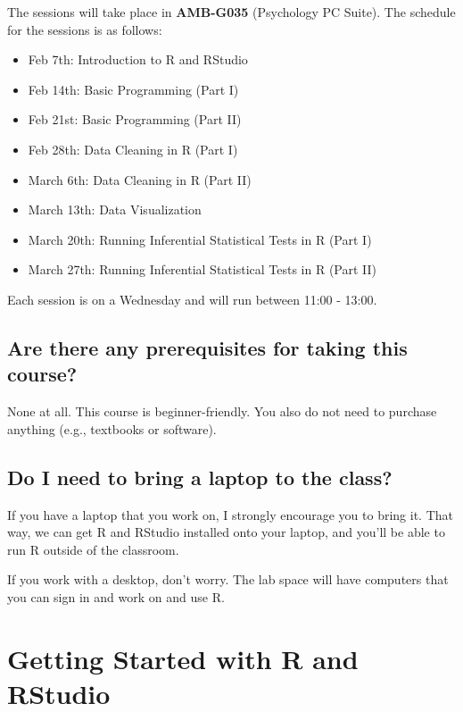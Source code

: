 \documentclass[
]{book}
\providecommand{\tightlist}{%
  \setlength{\itemsep}{0pt}\setlength{\parskip}{0pt}}
\begin{document}
The sessions will take place in \textbf{AMB-G035} (Psychology PC Suite). The schedule for the sessions is as follows:

\begin{itemize}
\tightlist
\item
  Feb 7th: Introduction to R and RStudio
\item
  Feb 14th: Basic Programming (Part I)
\item
  Feb 21st: Basic Programming (Part II)
\item
  Feb 28th: Data Cleaning in R (Part I)
\item
  March 6th: Data Cleaning in R (Part II)
\item
  March 13th: Data Visualization
\item
  March 20th: Running Inferential Statistical Tests in R (Part I)
\item
  March 27th: Running Inferential Statistical Tests in R (Part II)
\end{itemize}

Each session is on a Wednesday and will run between 11:00 - 13:00.

\hypertarget{are-there-any-prerequisites-for-taking-this-course}{%
\section{Are there any prerequisites for taking this course?}\label{are-there-any-prerequisites-for-taking-this-course}}

None at all. This course is beginner-friendly. You also do not need to purchase anything (e.g., textbooks or software).

\hypertarget{do-i-need-to-bring-a-laptop-to-the-class}{%
\section{Do I need to bring a laptop to the class?}\label{do-i-need-to-bring-a-laptop-to-the-class}}

If you have a laptop that you work on, I strongly encourage you to bring it. That way, we can get R and RStudio installed onto your laptop, and you'll be able to run R outside of the classroom.

If you work with a desktop, don't worry. The lab space will have computers that you can sign in and work on and use R.

\hypertarget{rstudio}{%
\chapter{Getting Started with R and RStudio}\label{rstudio}}
\end{document}
